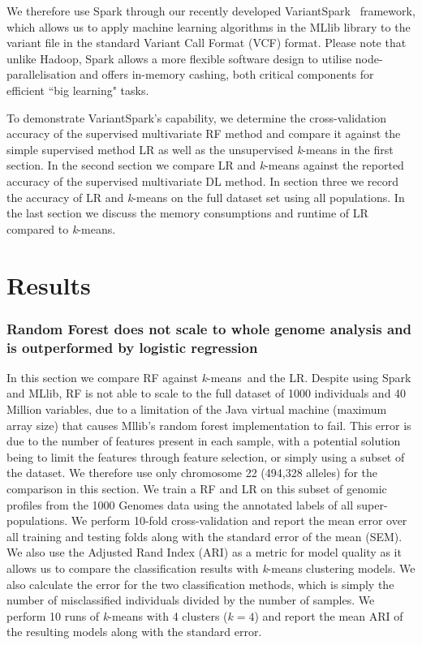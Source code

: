 \documentclass{llncs}
\newcommand{\variantSpark}{{\sc VariantSpark}}
\newcommand{\kMeans}{\textit{k}-means}
\begin{document}
{We therefore use {\sc Spark} through our recently developed \variantSpark~\cite{OBrien} framework, which allows us to
apply machine learning algorithms in the {\sc MLlib} library to the variant file in the standard Variant Call Format (VCF) format.  Please note
that unlike {\sc Hadoop}, {\sc Spark} allows a more flexible software design to utilise node-parallelisation and offers
in-memory cashing, both critical components for efficient ``big learning" tasks.

To demonstrate \variantSpark's capability, we determine the cross-validation accuracy of the supervised multivariate RF
method and compare it against the simple supervised method LR as well as the unsupervised \kMeans{} in the first
section.  In the second section we compare LR and \kMeans{} against the reported accuracy of the supervised multivariate
DL method.  In section three we record the accuracy of LR and \kMeans{} on the full dataset set using all populations.
In the last section we discuss the memory consumptions and runtime of LR compared to \kMeans{}.


\section{Results}

\subsubsection{Random Forest does not scale to whole genome analysis and is outperformed by logistic regression}
In this section we compare RF against \kMeans\ and the LR.  
Despite using {\sc Spark} and {\sc MLlib}, RF is not able to scale to the full dataset of 1000 individuals and 40
Million variables, due to a limitation of the Java virtual machine (maximum array size) that causes {\sc Mllib}'s
random forest implementation to fail. This error is due to the number of features present in each sample,
with a potential solution being to limit the features through feature selection, or simply using a subset of the dataset.
We therefore use only chromosome 22 (494,328 alleles) for the comparison in this section.  We train a RF
and LR on this subset of genomic profiles from the 1000 Genomes data using the annotated labels of all
super-populations.  We perform 10-fold cross-validation and report the mean error over all training and testing folds
along with the standard error of the mean (SEM). We also use the Adjusted Rand Index (ARI) as a metric for model quality
as it allows us to compare the classification results with \kMeans{} clustering models. We also calculate the error
for the two classification methods, which is simply the number of misclassified individuals divided by the number of samples.
We perform 10 runs of \kMeans{} with 4 clusters (\(k=4\)) and report the mean ARI of the
resulting models along with the standard error.

}
\end{document}
